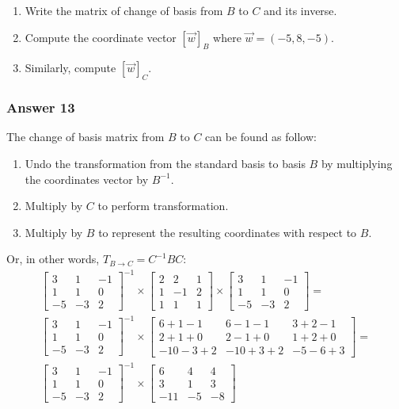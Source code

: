 \documentclass[11pt]{article}
\begin{document}
\begin{enumerate}
\item Write the matrix of change of basis from $B$ to $C$ and its inverse.
\item Compute the coordinate vector $[\vec{w}]_B$ where $\vec{w} = (-5,8,-5)$.
\item Similarly, compute $[\vec{w}]_C$.
\end{enumerate}

\subsubsection{Answer 13}
\label{sec-1-6-1}
The change of basis matrix from $B$ to $C$ can be found as follow:
\begin{enumerate}
\item Undo the transformation from the standard basis to basis $B$ by
multiplying the coordinates vector by $B^{-1}$.
\item Multiply by $C$ to perform transformation.
\item Multiply by $B$ to represent the resulting coordinates with respect to
$B$.
\end{enumerate}

Or, in other words, $T_{B\to C} = C^{-1}BC$:
\begin{align*}
  \begin{bmatrix}
    3  & 1  & -1 \\
    1  & 1  & 0 \\
    -5 & -3 & 2
  \end{bmatrix}^{-1} \times
  \begin{bmatrix}
    2 & 2  & 1 \\
    1 & -1 & 2 \\
    1 & 1  & 1
  \end{bmatrix} \times
  \begin{bmatrix}
    3  & 1  & -1 \\
    1  & 1  & 0 \\
    -5 & -3 & 2
  \end{bmatrix} = \\
  \begin{bmatrix}
    3  & 1  & -1 \\
    1  & 1  & 0 \\
    -5 & -3 & 2
  \end{bmatrix}^{-1} \times
  \begin{bmatrix}
    6 + 1 - 1 & 6 - 1 - 1 & 3 + 2 - 1 \\
    2 + 1 + 0 & 2 - 1 + 0 & 1 + 2 + 0 \\
    -10 - 3 + 2 & -10 + 3 + 2 & -5 - 6 + 3
  \end{bmatrix} = \\
  \begin{bmatrix}
    3  & 1  & -1 \\
    1  & 1  & 0 \\
    -5 & -3 & 2
  \end{bmatrix}^{-1} \times
  \begin{bmatrix}
    6 & 4 & 4 \\
    3 & 1 & 3 \\
    -11 & -5 & -8
  \end{bmatrix}
\end{align*}
\end{document}
